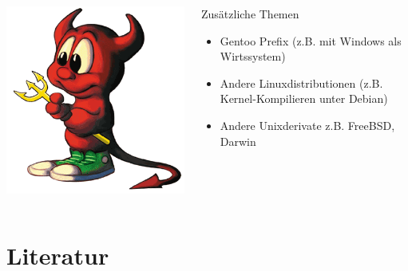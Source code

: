\documentclass[utf8]{beamer}
\begin{document}
\begin{frame}
\begin{columns}
\vspace{-10pt}
\begin{center}\includegraphics[scale=0.2]{freebsd-logo.png}\end{center}
\vspace{-10pt}
\begin{block}{Zusätzliche Themen}
  \begin{itemize}
      \item Gentoo Prefix (z.B. mit Windows als Wirtssystem)
      \item Andere Linuxdistributionen (z.B. Kernel-Kompilieren unter Debian)
      \item Andere Unixderivate z.B. FreeBSD, Darwin
  \end{itemize}
\end{block}
\end{columns}

\end{frame}

\section{Literatur}
\end{document}
